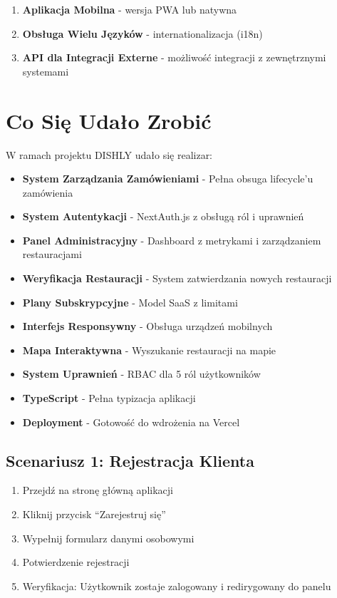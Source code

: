 \documentclass[12pt,a4paper,utf-8]{article}
\begin{document}
\begin{enumerate}
    \item \textbf{Aplikacja Mobilna}  -  wersja PWA lub natywna
    \item \textbf{Obsługa Wielu Języków}  -  internationalizacja (i18n)
    \item \textbf{API dla Integracji Externe}  -  możliwość integracji z zewnętrznymi systemami
\end{enumerate}

\section{Co Się Udało Zrobić}

W ramach projektu DISHLY udało się realizar:

\begin{itemize}
    \item [OK] \textbf{System Zarządzania Zamówieniami}  -  Pełna obsuga lifecycle'u zamówienia
    \item [OK] \textbf{System Autentykacji}  -  NextAuth.js z obsługą ról i uprawnień
    \item [OK] \textbf{Panel Administracyjny}  -  Dashboard z metrykami i zarządzaniem restauracjami
    \item [OK] \textbf{Weryfikacja Restauracji}  -  System zatwierdzania nowych restauracji
    \item [OK] \textbf{Plany Subskrypcyjne}  -  Model SaaS z limitami
    \item [OK] \textbf{Interfejs Responsywny}  -  Obsługa urządzeń mobilnych
    \item [OK] \textbf{Mapa Interaktywna}  -  Wyszukanie restauracji na mapie
    \item [OK] \textbf{System Uprawnień}  -  RBAC dla 5 ról użytkowników
    \item [OK] \textbf{TypeScript}  -  Pełna typizacja aplikacji
    \item [OK] \textbf{Deployment}  -  Gotowość do wdrożenia na Vercel
\end{itemize}

\subsection{Scenariusz 1: Rejestracja Klienta}

\begin{enumerate}
    \item Przejdź na stronę główną aplikacji
    \item Kliknij przycisk ``Zarejestruj się''
    \item Wypełnij formularz danymi osobowymi
    \item Potwierdzenie rejestracji
    \item Weryfikacja: Użytkownik zostaje zalogowany i redirygowany do panelu
\end{enumerate}
\end{document}
